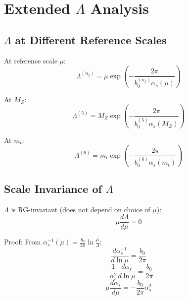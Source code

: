\documentclass[11pt,a4paper]{article}
\theoremstyle{definition}
\begin{document}
\section{Extended $\Lambda$ Analysis}
\label{app:extended-lambda}

\subsection{$\Lambda$ at Different Reference Scales}
\label{subsec:lambda-scales}

At reference scale $\mu$:
\begin{equation}
\label{eq:lambda-at-mu-gen}
\Lambda^{(n_f)} = \mu \exp\left(-\frac{2\pi}{b_0^{(n_f)}\alpha_s(\mu)}\right)
\end{equation}

At $M_Z$:
\begin{equation}
\label{eq:lambda-at-mz-app}
\Lambda^{(5)} = M_Z \exp\left(-\frac{2\pi}{b_0^{(5)}\alpha_s(M_Z)}\right)
\end{equation}

At $m_t$:
\begin{equation}
\label{eq:lambda-at-mt-app}
\Lambda^{(6)} = m_t \exp\left(-\frac{2\pi}{b_0^{(6)}\alpha_s(m_t)}\right)
\end{equation}

\subsection{Scale Invariance of $\Lambda$}
\label{subsec:lambda-invariance}

$\Lambda$ is RG-invariant (does not depend on choice of $\mu$):
\begin{equation}
\label{eq:lambda-rg-inv-app}
\mu\frac{d\Lambda}{d\mu} = 0
\end{equation}

Proof: From $\alpha_s^{-1}(\mu) = \frac{b_0}{2\pi}\ln\frac{\mu}{\Lambda}$:
\begin{equation}
\label{eq:lambda-proof-1}
\frac{d\alpha_s^{-1}}{d\ln\mu} = \frac{b_0}{2\pi}
\end{equation}
\begin{equation}
\label{eq:lambda-proof-2}
-\frac{1}{\alpha_s^2}\frac{d\alpha_s}{d\ln\mu} = \frac{b_0}{2\pi}
\end{equation}
\begin{equation}
\label{eq:lambda-proof-3}
\mu\frac{d\alpha_s}{d\mu} = -\frac{b_0}{2\pi}\alpha_s^2
\end{equation}
\end{document}
